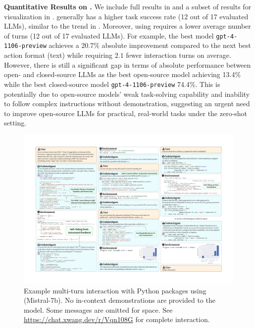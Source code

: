 \noindent \textbf{Quantitative Results on \evalname.}
We include full results in  and a subset of results for visualization in .
% 
\approach generally has a higher task success rate (12 out of 17 evaluated LLMs), similar to the trend in . Moreover, using \approach requires a lower average number of turns (12 out of 17 evaluated LLMs).
% 
For example, the best model \texttt{gpt-4-1106-preview} achieves a $20.7$\% absolute improvement compared to the next best action format (text) while requiring $2.1$ fewer interaction turns on average.
%
However, there is still a significant gap in terms of absolute \approach performance between open- and closed-source LLMs as the best open-source model achieving 13.4\% while the best closed-source model \texttt{gpt-4-1106-preview} 74.4\%. This is potentially due to open-source models' weak task-solving capability and inability to follow complex instructions without demonstration, suggesting an urgent need to improve open-source LLMs for practical, real-world tasks under the zero-shot setting.

\begin{figure}[!ht]
    \centering
    \includegraphics[width=\textwidth]{figures/codeactagent-qualitative-succint-3col.pdf}
    \vspace{-20pt}
    \caption{Example multi-turn interaction with Python packages using \modelname (Mistral-7b). No in-context demonstrations are provided to the model. Some messages are omitted for space.
    See \url{https://chat.xwang.dev/r/Vqn108G} for complete interaction.
    }
    \label{fig:qualitative_example}
\end{figure}


